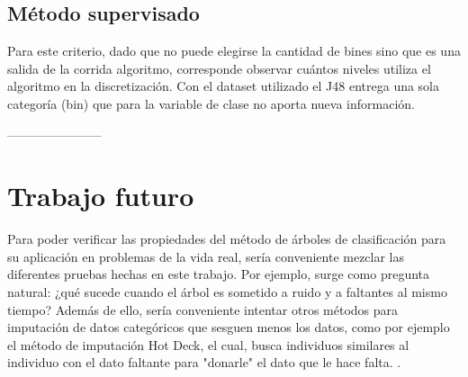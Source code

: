 \documentclass[]{article}
\begin{document}
\subsection{Método supervisado}
Para este criterio, dado que no puede elegirse la cantidad de bines sino que es una salida de la corrida algoritmo, corresponde observar cuántos niveles utiliza el algoritmo en la discretización. Con el dataset utilizado el J48 entrega una sola categoría (bin) que para la variable de clase no aporta nueva información. 

%
%
%


-----------------------
\section*{Trabajo futuro}
Para poder verificar las propiedades del método de árboles de clasificación para su aplicación en problemas de la vida real, sería conveniente mezclar las diferentes pruebas hechas en este trabajo. Por ejemplo, surge como pregunta natural: ¿qué sucede cuando el árbol es sometido a ruido y a faltantes al mismo tiempo? Además de ello, sería conveniente intentar otros métodos para imputación de datos categóricos que sesguen menos los datos, como por ejemplo el método de imputación Hot Deck, el cual, busca individuos similares al individuo con el dato faltante para "donarle" el dato que le hace falta. \cite{Rodgers1984}.
\end{document}
